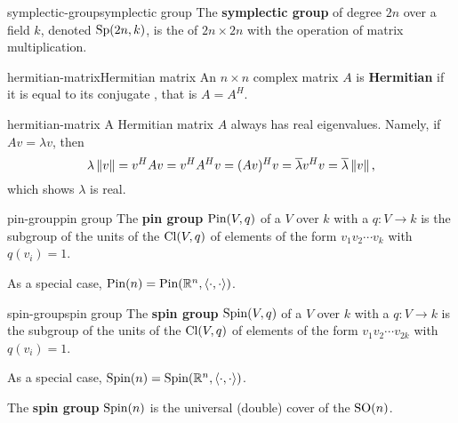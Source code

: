 \begin{topic}{symplectic-group}{symplectic group}
    The \textbf{symplectic group} of degree $2n$ over a field $k$, denoted $\textup{Sp}(2n, k)$, is the  of $2n \times 2n$  with the operation of matrix multiplication.
\end{topic}

\begin{topic}{hermitian-matrix}{Hermitian matrix}
    An $n \times n$ complex matrix $A$ is \textbf{Hermitian} if it is equal to its conjugate , that is $A = A^H$.
\end{topic}

\begin{example}{hermitian-matrix}
    A Hermitian matrix $A$ always has real eigenvalues. Namely, if $Av = \lambda v$, then
    \[ \lambda \left\|v\right\| = v^H A v = v^H A^H v = (A v)^H v = \overline{\lambda} v^H v = \overline{\lambda} \left\|v\right\| , \]
    which shows $\lambda$ is real.
\end{example}

\begin{topic}{pin-group}{pin group}
    The \textbf{pin group} $\textup{Pin}(V, q)$ of a  $V$ over $k$ with a  $q : V \to k$ is the subgroup of the units of the  $\textup{Cl}(V, q)$ of elements of the form $v_1 v_2 \cdots v_k$ with $q(v_i) = 1$.
    
    As a special case, $\textup{Pin}(n) = \textup{Pin}(\mathbb{R}^n, \langle \cdot, \cdot \rangle)$.
\end{topic}

\begin{topic}{spin-group}{spin group}
    The \textbf{spin group} $\textup{Spin}(V, q)$ of a  $V$ over $k$ with a  $q : V \to k$ is the subgroup of the units of the  $\textup{Cl}(V, q)$ of elements of the form $v_1 v_2 \cdots v_{2k}$ with $q(v_i) = 1$.

    As a special case, $\textup{Spin}(n) = \textup{Spin}(\mathbb{R}^n, \langle \cdot, \cdot \rangle)$.
    
    The \textbf{spin group} $\textup{Spin}(n)$ is the universal (double) cover of the  $\textup{SO}(n)$.
\end{topic}

